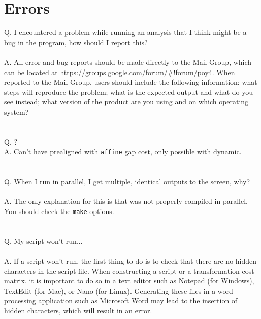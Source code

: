 \section{Errors}
Q. I encountered a problem while running an analysis that I think might be a bug in the program, how should 
I report this?\\
\\
A. All error and bug reports should be made directly to the \poy Mail Group, which can be located at
\url{https://groups.google.com/forum/#!forum/poy4}. When reported to the Mail Group, users
should include the following information: what steps will reproduce the problem; what is the expected output and 
what do you see instead;  what version of the product are you using and on which operating system?\\
\\
\\
Q. ?
\\
A. Can't have prealigned with \texttt{affine} gap cost, only possible with dynamic.\\
\\
\\
Q. When I run \poy in parallel, I get multiple, identical outputs to the screen, why?\\
\\
A. The only explanation for this is that \poy was not properly compiled in parallel. You should check the \texttt{make}
options.\\
\\
\\
Q. My script won't run...\\
\\
A. If a script won't run, the first thing to do is to check that there are no hidden characters in the script file.
When constructing a script or a transformation cost matrix, it is important to do so in a text editor 
such as Notepad (for Windows), TextEdit (for Mac), or Nano (for Linux). Generating these files in 
a word processing application such as Microsoft Word may lead to the insertion of hidden 
 characters, which will result in an error.\\

